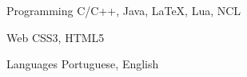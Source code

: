 

\begin{cvskills}

  \cvskill
    {Programming} %
    {C/C++, Java, LaTeX, Lua, NCL} %

  \cvskill
    {Web} %
    {CSS3, HTML5} %

  \cvskill
    {Languages} %
    {Portuguese, English} %

\end{cvskills}
